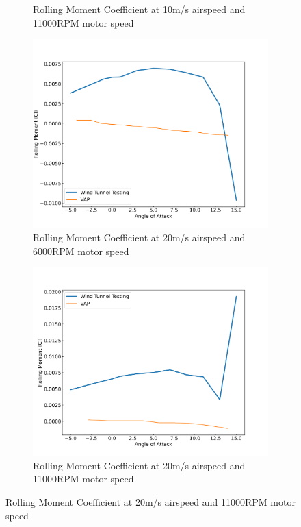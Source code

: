 \begin{figure}[H]
\begin{subfigure}[b]{0.467\textwidth}
        \caption{Rolling Moment Coefficient at 10m/s airspeed and 11000RPM motor speed}
        \label{fig:VAP_pusher_Cl_10ms_11000}
    \end{subfigure}
    \begin{subfigure}[b]{0.467\textwidth}
        \centering
        \includegraphics[width=\textwidth]{05_Results/VAP/pusher/Cl/20ms_6000RPM_Cl.png}
        \caption{Rolling Moment Coefficient at 20m/s airspeed and 6000RPM motor speed}
        \label{fig:VAP_psuher_Cl_20ms_6000}
    \end{subfigure}
    \begin{subfigure}[b]{0.467\textwidth}
        \centering
        \includegraphics[width=\textwidth]{05_Results/VAP/pusher/Cl/20ms_11000RPM_Cl.png}
        \caption{Rolling Moment Coefficient at 20m/s airspeed and 11000RPM motor speed}
        \label{fig:VAP_pusher_Cl_20ms_11000}
    \end{subfigure}
\end{figure}


